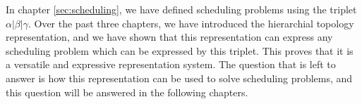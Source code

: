 In chapter \ref{sec:scheduling}, we have defined scheduling problems using the triplet $\alpha | \beta | \gamma$. Over the past three chapters, we have introduced the hierarchial topology representation, and we have shown that this representation can express any scheduling problem which can be expressed by this triplet. This proves that it is a versatile and expressive representation system. The question that is left to answer is how this representation can be used to solve scheduling problems, and this question will be answered in the following chapters.